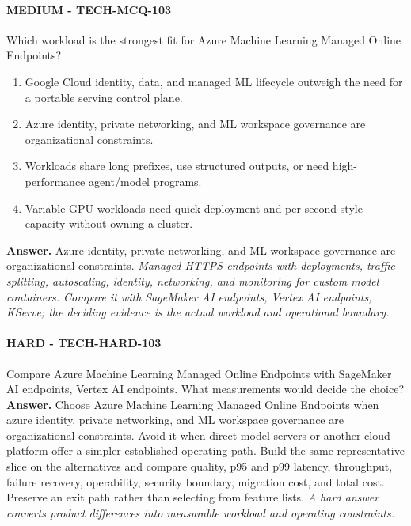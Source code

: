 \paragraph{MEDIUM - TECH-MCQ-103} Which workload is the strongest fit for Azure Machine Learning Managed Online Endpoints?
\begin{enumerate}[label=\Alph*.]
\item Google Cloud identity, data, and managed ML lifecycle outweigh the need for a portable serving control plane.
\item Azure identity, private networking, and ML workspace governance are organizational constraints.
\item Workloads share long prefixes, use structured outputs, or need high-performance agent/model programs.
\item Variable GPU workloads need quick deployment and per-second-style capacity without owning a cluster.
\end{enumerate}
\textbf{Answer.} Azure identity, private networking, and ML workspace governance are organizational constraints.
\textit{Managed HTTPS endpoints with deployments, traffic splitting, autoscaling, identity, networking, and monitoring for custom model containers. Compare it with SageMaker AI endpoints, Vertex AI endpoints, KServe; the deciding evidence is the actual workload and operational boundary.}
\paragraph{HARD - TECH-HARD-103} Compare Azure Machine Learning Managed Online Endpoints with SageMaker AI endpoints, Vertex AI endpoints. What measurements would decide the choice?
\textbf{Answer.} Choose Azure Machine Learning Managed Online Endpoints when azure identity, private networking, and ML workspace governance are organizational constraints. Avoid it when direct model servers or another cloud platform offer a simpler established operating path. Build the same representative slice on the alternatives and compare quality, p95 and p99 latency, throughput, failure recovery, operability, security boundary, migration cost, and total cost. Preserve an exit path rather than selecting from feature lists.
\textit{A hard answer converts product differences into measurable workload and operating constraints.}
